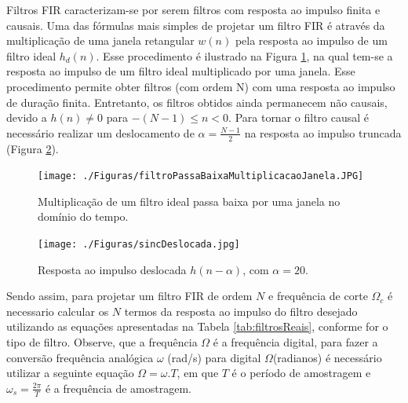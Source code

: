 \documentclass[12pt,addpoints]{exam}
\begin{document}
Filtros FIR  caracterizam-se por serem filtros com resposta ao impulso finita e causais.  Uma das fórmulas mais simples de projetar um filtro FIR é através da multiplicação de uma janela retangular $w(n)$ pela resposta ao impulso de um filtro ideal $h_d(n)$. Esse procedimento é ilustrado na Figura \ref{janelamento}, na qual tem-se a resposta ao impulso de um filtro ideal  multiplicado por uma janela. Esse procedimento permite obter filtros (com ordem N) com uma resposta ao impulso de duração finita. Entretanto, os filtros obtidos ainda permanecem não causais, devido a $h(n)\neq0$ para $-(N-1)\leq n<0$. Para tornar o filtro causal é necessário realizar um deslocamento de $\alpha=\frac{N-1}{2}$ na resposta ao impulso truncada (Figura \ref{fig:sinDeslocada}).

\begin{figure}[t]
	\centering
		\texttt{[image: ./Figuras/filtroPassaBaixaMultiplicacaoJanela.JPG]}
		\caption{Multiplicação de um filtro ideal passa baixa por uma janela no domínio do tempo.} 
	\label{janelamento}
\end{figure}

		
\begin{figure}[htb]
	\centering
		\texttt{[image: ./Figuras/sincDeslocada.jpg]}
	\caption{Resposta ao impulso deslocada $h(n-\alpha)$, com $\alpha=20$.}
	\label{fig:sinDeslocada}
\end{figure}

Sendo assim, para projetar um filtro FIR de ordem $N$ e frequência de corte $\Omega_c$ é necessario calcular os $N$ termos da resposta ao impulso do filtro desejado utilizando as equações apresentadas na Tabela    \ref{tab:filtrosReais}, conforme for o tipo de filtro. Observe, que a frequência $\Omega$ é a frequência digital, para fazer a conversão frequência analógica $\omega$  (rad/s) para digital $\Omega$(radianos) é necessário utilizar a seguinte equação $\Omega=\omega.T$, em que $T$ é o período de amostragem e $\omega_s=\frac{2 \pi}{T}$ é a frequência de amostragem.
\end{document}
